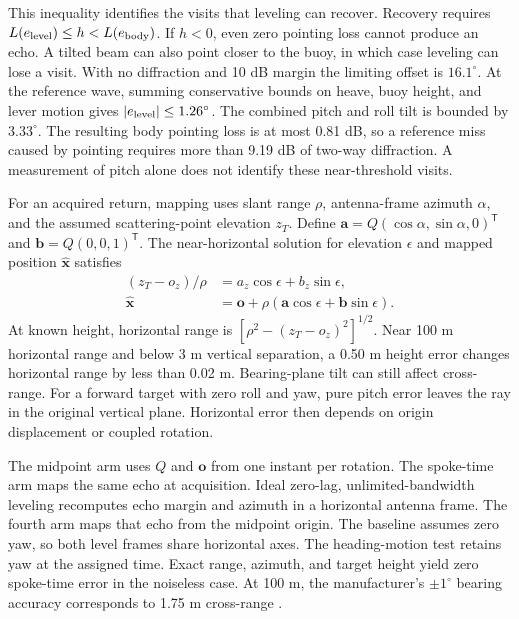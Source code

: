 \documentclass[nofoot]{asmeconf}
\begin{document}
This inequality identifies the visits that leveling can recover. Recovery requires $L(e_{\rm level})\le h<L(e_{\rm body})$. If $h<0$, even zero pointing loss cannot produce an echo. A tilted beam can also point closer to the buoy, in which case leveling can lose a visit. With no diffraction and 10 dB margin the limiting offset is $16.1^\circ$. At the reference wave, summing conservative bounds on heave, buoy height, and lever motion gives $|e_{\rm level}|\le1.26^\circ$. The combined pitch and roll tilt is bounded by $3.33^\circ$. The resulting body pointing loss is at most 0.81 dB, so a reference miss caused by pointing requires more than 9.19 dB of two-way diffraction. A measurement of pitch alone does not identify these near-threshold visits.

For an acquired return, mapping uses slant range $\rho$, antenna-frame azimuth $\alpha$, and the assumed scattering-point elevation $z_T$. Define $\mathbf{a}=Q(\cos\alpha,\sin\alpha,0)^\mathsf{T}$ and $\mathbf{b}=Q(0,0,1)^\mathsf{T}$. The near-horizontal solution for elevation $\epsilon$ and mapped position $\hat{\mathbf{x}}$ satisfies
\begin{align}
 (z_T-o_z)/\rho &= a_z\cos\epsilon+b_z\sin\epsilon,\\
 \hat{\mathbf{x}} &= \mathbf{o}+\rho(\mathbf{a}\cos\epsilon+\mathbf{b}\sin\epsilon).
\end{align}
At known height, horizontal range is $[\rho^2-(z_T-o_z)^2]^{1/2}$. Near 100 m horizontal range and below 3 m vertical separation, a 0.50 m height error changes horizontal range by less than 0.02 m. Bearing-plane tilt can still affect cross-range. For a forward target with zero roll and yaw, pure pitch error leaves the ray in the original vertical plane. Horizontal error then depends on origin displacement or coupled rotation.

The midpoint arm uses $Q$ and $\mathbf{o}$ from one instant per rotation. The spoke-time arm maps the same echo at acquisition. Ideal zero-lag, unlimited-bandwidth leveling recomputes echo margin and azimuth in a horizontal antenna frame. The fourth arm maps that echo from the midpoint origin. The baseline assumes zero yaw, so both level frames share horizontal axes. The heading-motion test retains yaw at the assigned time. Exact range, azimuth, and target height yield zero spoke-time error in the noiseless case. At 100 m, the manufacturer's $\pm1^\circ$ bearing accuracy corresponds to 1.75 m cross-range \cite{Furuno2016DRS4DNXT}.
\end{document}
